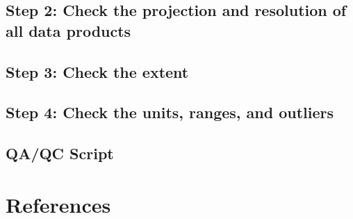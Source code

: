 \documentclass[
  10pt,
  b5paper,
  oneside]{book}
\begin{document}
\hypertarget{step-2-check-the-projection-and-resolution-of-all-data-products}{%
\section*{Step 2: Check the projection and resolution of all data products}\label{step-2-check-the-projection-and-resolution-of-all-data-products}}

\hypertarget{step-3-check-the-extent}{%
\section*{Step 3: Check the extent}\label{step-3-check-the-extent}}

\hypertarget{step-4-check-the-units-ranges-and-outliers}{%
\section*{Step 4: Check the units, ranges, and outliers}\label{step-4-check-the-units-ranges-and-outliers}}

\hypertarget{qaqc-script}{%
\section*{QA/QC Script}\label{qaqc-script}}

\hypertarget{references}{%
\chapter*{References}\label{references}}


\end{document}
